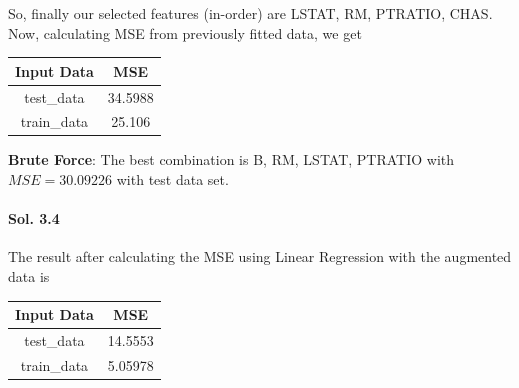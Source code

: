 \documentclass[]{report}
\begin{document}
	  	So, finally our selected features (in-order) are LSTAT, RM, PTRATIO, CHAS. \\

	  	Now, calculating MSE from previously fitted data, we get

	  	\begin{center}
	  	\begin{tabular}{c|c}
			\hline
			 Input Data   &     MSE \\
			\hline
			 test\_data    & 34.5988 \\
			 train\_data   & 25.106  \\
			\hline
			\end{tabular}
	  	\end{center}

	  	\textbf{Brute Force}: The best combination is B, RM, LSTAT, PTRATIO with $MSE = 30.09226$ with test data set.

	  \paragraph{Sol. 3.4}
	  	The result after calculating the MSE using Linear Regression with the augmented data is

	  	\begin{center}
	  	\begin{tabular}{c|c}
			\hline
			 Input Data   &     MSE \\
			\hline
			 test\_data    & 14.5553 \\
			 train\_data   & 5.05978 \\
			\hline
			\end{tabular}
	  	\end{center}
\end{document}
